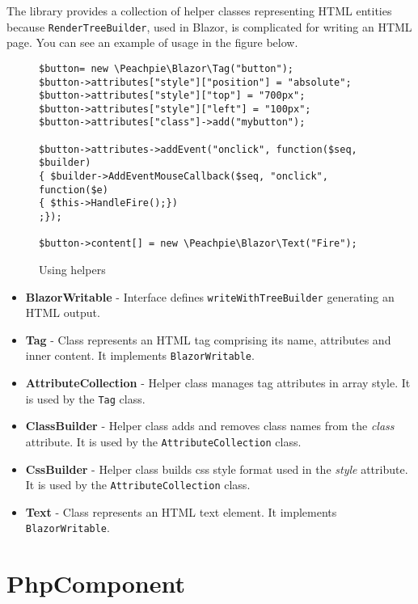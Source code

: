 The library provides a collection of helper classes representing HTML entities because \texttt{RenderTreeBuilder}, used in Blazor, is complicated for writing an HTML page. You can see an example of usage in the figure below.
\par
\begin{figure}[H]
\begin{lstlisting}
$button= new \Peachpie\Blazor\Tag("button");
$button->attributes["style"]["position"] = "absolute";
$button->attributes["style"]["top"] = "700px";
$button->attributes["style"]["left"] = "100px";
$button->attributes["class"]->add("mybutton");        
        
$button->attributes->addEvent("onclick", function($seq, $builder) 
{ $builder->AddEventMouseCallback($seq, "onclick", function($e) 
{ $this->HandleFire();})
;});
        
$button->content[] = new \Peachpie\Blazor\Text("Fire");
\end{lstlisting}
\caption{Using helpers}
\label{img36:helpers}
\end{figure}
\par
\begin{itemize}
\item \textbf{BlazorWritable} - Interface defines \texttt{writeWithTreeBuilder} generating an HTML output. 
\item \textbf{Tag} - Class represents an HTML tag comprising its name, attributes and inner content. It implements \texttt{BlazorWritable}.  
\item \textbf{AttributeCollection} - Helper class manages tag attributes in array style. It is used by the \texttt{Tag} class.
\item \textbf{ClassBuilder} - Helper class adds and removes class names from the \textit{class} attribute. It is used by the \texttt{AttributeCollection} class.  
\item \textbf{CssBuilder} - Helper class builds css style format used in the \textit{style} attribute. It is used by the \texttt{AttributeCollection} class.  
\item \textbf{Text} - Class represents an HTML text element. It implements \texttt{BlazorWritable}.  
\end{itemize}
\par

\section{PhpComponent}

